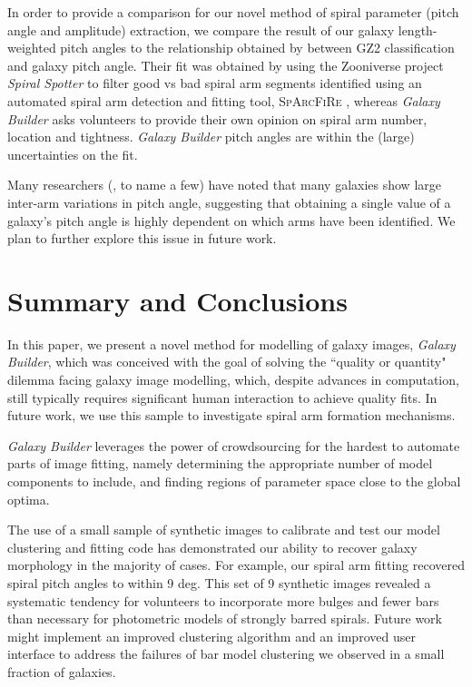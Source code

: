 \documentclass[trackchanges]{aastex63}
\begin{document}
In order to provide a comparison for our novel method of spiral parameter (pitch angle and amplitude) extraction, we compare the result of our galaxy length-weighted pitch angles to the relationship obtained by \citet{Hart2016:1607.01019v1} between GZ2 classification and galaxy pitch angle. Their fit was obtained by using the Zooniverse project \textit{Spiral Spotter} to filter good vs bad spiral arm segments identified using an automated spiral arm detection and fitting tool, \textsc{SpArcFiRe} \citep{Davis2014:1402.1910v1}, whereas \textit{Galaxy Builder} asks volunteers to provide their own opinion on spiral arm number, location and tightness. \textit{Galaxy Builder} pitch angles are within the (large) uncertainties on the \citet{Hart2016:1607.01019v1} fit.

Many researchers (\citealt{Davis2014:1402.1910v1}, \citealt{2019arXiv190804246D} to name a few) have noted that many galaxies show large inter-arm variations in pitch angle, suggesting that obtaining a single value of a galaxy's pitch angle is highly dependent on which arms have been identified. We plan to further explore this issue in future work.

\section{Summary and Conclusions}
\label{sec:conclusions}
In this paper, we present a novel method for modelling of galaxy images, \textit{Galaxy Builder}, which was conceived with the goal of solving the ``quality or quantity" dilemma facing galaxy image modelling, which, despite advances in computation, still typically requires significant human interaction to achieve quality fits. In future work, we use this sample to investigate spiral arm formation mechanisms.

\textit{Galaxy Builder} leverages the power of crowdsourcing for the hardest to automate parts of image fitting, namely determining the appropriate number of model components to include, and finding regions of parameter space close to the global optima.

The use of a small sample of synthetic images to calibrate and test our model clustering and fitting code has demonstrated our ability to recover galaxy morphology in the majority of cases. For example, our spiral arm fitting recovered spiral pitch angles to within 9 deg. This set of 9 synthetic images revealed a systematic tendency for volunteers to incorporate more bulges and fewer bars than necessary for photometric models of strongly barred spirals. Future work might implement an improved clustering algorithm and an improved user interface to address the failures of bar model clustering we observed in a small fraction of galaxies.
\end{document}
